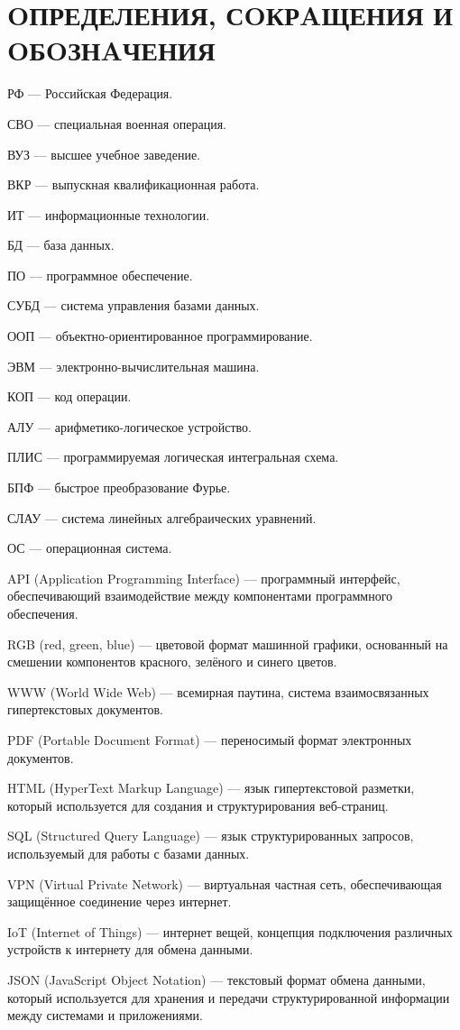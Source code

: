 \documentclass[14pt]{extarticle}
\begin{document}
\section*{OПРЕДЕЛЕНИЯ, СOКРAЩЕНИЯ И OБOЗНAЧЕНИЯ}
\par РФ --- Российская Федерация.
\par СВО --- специальная военная операция.
\par ВУЗ --- высшее учебное заведение.
\par ВКР --- выпускная квалификационная работа.
\par ИТ --- информационные технологии.
\par БД --- база данных.
\par ПО --- программное обеспечение.
\par СУБД --- система управления базами данных.
\par ООП --- объектно-ориентированное программирование.
\par ЭВМ --- электронно-вычислительная машина.
\par КОП --- код операции.
\par АЛУ --- арифметико-логическое устройство.
\par ПЛИС --- программируемая логическая интегральная схема.
\par БПФ --- быстрое преобразование Фурье.
\par СЛАУ --- система линейных алгебраических уравнений.
\par ОС --- операционная система.
\par API (Application Programming Interface) --- программный интерфейс, обеспечивающий взаимодействие между компонентами программного обеспечения.
\par RGB (red, green, blue) --- цветовой формат машинной графики, основанный на смешении компонентов красного, зелёного и синего цветов.
\par WWW (World Wide Web) --- всемирная паутина, система взаимосвязанных гипертекстовых документов.
\par PDF (Portable Document Format) --- переносимый формат электронных документов.
\par HTML (HyperText Markup Language) --- язык гипертекстовой разметки, который используется для создания и структурирования веб-страниц.
\par SQL (Structured Query Language) --- язык структурированных запросов, используемый для работы с базами данных.
\par VPN (Virtual Private Network) --- виртуальная частная сеть, обеспечивающая защищённое соединение через интернет.
\par IoT (Internet of Things) --- интернет вещей, концепция подключения различных устройств к интернету для обмена данными.
\par JSON (JavaScript Object Notation) --- текстовый формат обмена данными, который используется для хранения и передачи структурированной информации между системами и приложениями.
\end{document}
